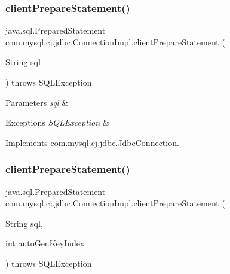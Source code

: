\subsubsection{\texorpdfstring{client\+Prepare\+Statement()}{clientPrepareStatement()}\hspace{0.1cm}{\footnotesize\ttfamily [1/7]}}
{\footnotesize\ttfamily java.\+sql.\+Prepared\+Statement com.\+mysql.\+cj.\+jdbc.\+Connection\+Impl.\+client\+Prepare\+Statement (\begin{DoxyParamCaption}\item[{String}]{sql }\end{DoxyParamCaption}) throws S\+Q\+L\+Exception}


\begin{DoxyParams}{Parameters}
{\em sql} & \\
\hline
\end{DoxyParams}

\begin{DoxyExceptions}{Exceptions}
{\em S\+Q\+L\+Exception} & \\
\hline
\end{DoxyExceptions}


Implements \mbox{\hyperlink{interfacecom_1_1mysql_1_1cj_1_1jdbc_1_1_jdbc_connection_a62db1ccf7a070833775481acb5e9e359}{com.\+mysql.\+cj.\+jdbc.\+Jdbc\+Connection}}.

\mbox{\label{classcom_1_1mysql_1_1cj_1_1jdbc_1_1_connection_impl_ac15baa66a2fe559cb558a0afd9c7cc03}} 
\subsubsection{\texorpdfstring{client\+Prepare\+Statement()}{clientPrepareStatement()}\hspace{0.1cm}{\footnotesize\ttfamily [2/7]}}
{\footnotesize\ttfamily java.\+sql.\+Prepared\+Statement com.\+mysql.\+cj.\+jdbc.\+Connection\+Impl.\+client\+Prepare\+Statement (\begin{DoxyParamCaption}\item[{String}]{sql,  }\item[{int}]{auto\+Gen\+Key\+Index }\end{DoxyParamCaption}) throws S\+Q\+L\+Exception}

